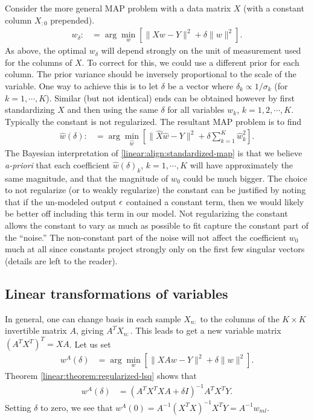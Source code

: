 Consider the more general MAP problem with a data matrix $X$ (with a constant column $X_{:0}$ prepended).
\begin{align*}
  w_\delta :&= \arg\min_w \left[ \|Xw-Y\|^2 + \delta\|w\|^2 \right].
\end{align*}
As above, the optimal $w_\delta$ will depend strongly on the unit of measurement used for the columns of $X$.  To correct for this, we could use a different prior for each column.  The prior variance should be inversely proportional to the scale of the variable.  One way to achieve this is to let $\delta$ be a vector where $\delta_k\propto1/\sigma_k$ (for $k=1,\cdots,K$).  Similar (but not identical) ends can be obtained however by first standardizing $X$ and then using the same $\delta$ for all variables $w_k$, $k=1,2,\cdots,K$.  Typically the constant is not regularized.  The resultant MAP problem is to find
\begin{align}
  \hat w(\delta) :&= \arg\min_{\hat w} \left[ \|\hat X\hat w - Y\|^2 + \delta \sum_{k=1}^K\hat w_k^2 \right].
  \label{linear:align:standardized-map}
\end{align}
The Bayesian interpretation of \eqref{linear:align:standardized-map} is that we believe \emph{a-priori} that each coefficient $\hat w(\delta)_k$, $k=1,\cdots,K$ will have approximately the same magnitude, and that the magnitude of $w_0$ could be much bigger.  The choice to not regularize (or to weakly regularize) the constant can be justified by noting that if the un-modeled output ${\epsilon}$ contained a constant term, then we would likely be better off including this term in our model.  Not regularizing the constant allows the constant to vary as much as possible to fit capture the constant part of the ``noise.''  The non-constant part of the noise will not affect the coefficient $w_0$ much at all since constants project strongly only on the first few singular vectors (details are left to the reader).


\subsection{Linear transformations of variables}
In general, one can change basis in each sample $X_{n:}$ to the columns of the $K\times K$ invertible matrix $A$, giving $A^TX_{n:}$.  This leads to get a new variable matrix $(A^TX^T)^T = XA$.  Let us set
\begin{align*}
  w^A(\delta) &= \arg\min_w \left[ \|XA w - Y\|^2 + \delta\|w\|^2 \right].
\end{align*}
Theorem \ref{linear:theorem:regularized-lsq} shows that
\begin{align*}
  w^A(\delta) &= (A^TX^TXA + \delta I)^{-1}A^TX^TY.
\end{align*}
Setting $\delta$ to zero, we see that $w^A(0) = A^{-1}(X^TX)^{-1}X^TY = A^{-1}w_{ml}$.

